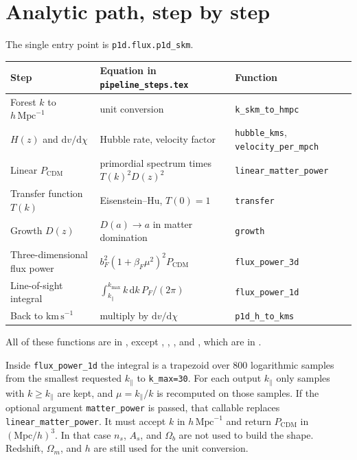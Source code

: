 \documentclass[11pt]{article}
\begin{document}
\section{Analytic path, step by step}

The single entry point is \texttt{p1d.flux.p1d\_skm}.

\begin{center}
\small
\begin{tabular}{@{}L{0.28\textwidth}L{0.36\textwidth}L{0.28\textwidth}@{}}
\toprule
Step & Equation in \texttt{pipeline\_steps.tex} & Function \\
\midrule
Forest $k$ to $h\,\mathrm{Mpc}^{-1}$ &
unit conversion &
\texttt{k\_skm\_to\_hmpc} \\
$H(z)$ and $\mathrm{d}v/\mathrm{d}\chi$ &
Hubble rate, velocity factor &
\texttt{hubble\_kms}, \texttt{velocity\_per\_mpch} \\
Linear $P_\mathrm{CDM}$ &
primordial spectrum times $T(k)^{2}D(z)^{2}$ &
\texttt{linear\_matter\_power} \\
Transfer function $T(k)$ &
Eisenstein--Hu, $T(0)=1$ &
\texttt{transfer} \\
Growth $D(z)$ &
$D(a)\to a$ in matter domination &
\texttt{growth} \\
Three-dimensional flux power &
$b_F^{2}(1+\beta_F\mu^{2})^{2}P_\mathrm{CDM}$ &
\texttt{flux\_power\_3d} \\
Line-of-sight integral &
$\int_{k_\parallel}^{k_\mathrm{max}} k\,\mathrm{d}k\,P_F/(2\pi)$ &
\texttt{flux\_power\_1d} \\
Back to $\mathrm{km\,s}^{-1}$ &
multiply by $\mathrm{d}v/\mathrm{d}\chi$ &
\texttt{p1d\_h\_to\_kms} \\
\bottomrule
\end{tabular}
\end{center}

\noindent
All of these functions are in , except , , , and , which are in .

Inside \texttt{flux\_power\_1d} the integral is a trapezoid over 800 logarithmic samples from the smallest requested $k_\parallel$ to \texttt{k\_max=30}. For each output $k_\parallel$ only samples with $k\ge k_\parallel$ are kept, and $\mu=k_\parallel/k$ is recomputed on those samples. If the optional argument \texttt{matter\_power} is passed, that callable replaces \texttt{linear\_matter\_power}. It must accept $k$ in $h\,\mathrm{Mpc}^{-1}$ and return $P_\mathrm{CDM}$ in $(\mathrm{Mpc}/h)^{3}$. In that case $n_s$, $A_s$, and $\Omega_b$ are not used to build the shape. Redshift, $\Omega_m$, and $h$ are still used for the unit conversion.
\end{document}
